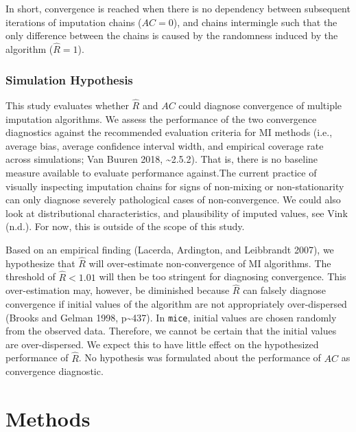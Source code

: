 \documentclass[
  Royal, times, sageapa]{sagej}
\begin{document}
In short, convergence is reached when there is no dependency between
subsequent iterations of imputation chains (\(AC = 0\)), and chains
intermingle such that the only difference between the chains is caused
by the randomness induced by the algorithm (\(\widehat{R} = 1\)).

\hypertarget{simulation-hypothesis}{%
\subsubsection{Simulation Hypothesis}\label{simulation-hypothesis}}

This study evaluates whether \(\widehat{R}\) and \(AC\) could diagnose
convergence of multiple imputation algorithms. We assess the performance
of the two convergence diagnostics against the recommended evaluation
criteria for MI methods (i.e., average bias, average confidence interval
width, and empirical coverage rate across simulations; Van Buuren 2018,
\textasciitilde2.5.2). That is, there is no baseline measure available
to evaluate performance against.The current practice of visually
inspecting imputation chains for signs of non-mixing or non-stationarity
can only diagnose severely pathological cases of non-convergence. We
could also look at distributional characteristics, and plausibility of
imputed values, see Vink (n.d.). For now, this is outside of the scope
of this study.

Based on an empirical finding (Lacerda, Ardington, and Leibbrandt 2007),
we hypothesize that \(\widehat{R}\) will over-estimate non-convergence
of MI algorithms. The threshold of \(\widehat{R} < 1.01\) will then be
too stringent for diagnosing convergence. This over-estimation may,
however, be diminished because \(\widehat{R}\) can falsely diagnose
convergence if initial values of the algorithm are not appropriately
over-dispersed (Brooks and Gelman 1998, p\textasciitilde437). In
\texttt{mice}, initial values are chosen randomly from the observed
data. Therefore, we cannot be certain that the initial values are
over-dispersed. We expect this to have little effect on the hypothesized
performance of \(\widehat{R}\). No hypothesis was formulated about the
performance of \(AC\) as convergence diagnostic.

\hypertarget{methods}{%
\section{Methods}\label{methods}}
\end{document}
